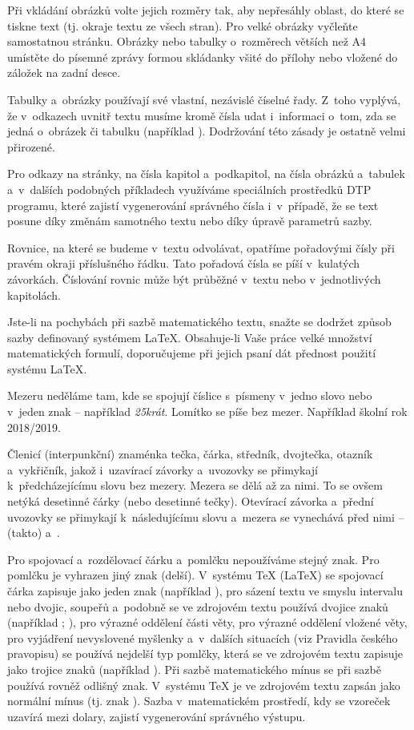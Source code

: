 Při vkládání obrázků volte jejich rozměry tak, aby nepřesáhly oblast, do které se tiskne text (tj. okraje textu ze všech stran). Pro velké obrázky vyčleňte samostatnou stránku. Obrázky nebo tabulky o~rozměrech větších než A4 umístěte do písemné zprávy formou skládanky všité do přílohy nebo vložené do záložek na zadní desce.

Tabulky a~obrázky používají své vlastní, nezávislé číselné řady. Z~toho vyplývá, že v~odkazech uvnitř textu musíme kromě čísla udat i~informaci o~tom, zda se jedná o~obrázek či tabulku (například ). Dodržování této zásady je ostatně velmi přirozené.

Pro odkazy na stránky, na čísla kapitol a~podkapitol, na čísla obrázků a~tabulek a~v~dalších podobných příkladech využíváme speciálních prostředků DTP programu, které zajistí vygenerování správného čísla i~v~případě, že se text posune díky změnám samotného textu nebo díky úpravě parametrů sazby. 


Rovnice, na které se budeme v~textu odvolávat, opatříme pořadovými čísly při pravém okraji příslušného řádku. Tato pořadová čísla se píší v~kulatých závorkách. Číslování rovnic může být průběžné v~textu nebo v~jednotlivých kapitolách. 

Jste-li na pochybách při sazbě matematického textu, snažte se dodržet způsob sazby definovaný systémem \LaTeX{}. Obsahuje-li Vaše práce velké množství matematických formulí, doporučujeme při jejich psaní dát přednost použití systému \LaTeX{}.

Mezeru neděláme tam, kde se spojují číslice s~písmeny v~jedno slovo nebo v~jeden znak -- například {\it 25krát}. Lomítko se píše bez mezer. Například školní rok 2018/2019.

Členicí (interpunkční) znaménka tečka, čárka, středník, dvojtečka, otazník a~vykřičník, jakož i~uzavírací závorky a~uvozovky se přimykají k~předcházejícímu slovu bez mezery. Mezera se dělá až za nimi. To se ovšem netýká desetinné čárky (nebo desetinné tečky). Otevírací závorka a~přední uvozovky se přimykají k~následujícímu slovu a~mezera se vynechává před nimi -- (takto) a~.

Pro spojovací a~rozdělovací čárku a~pomlčku nepoužíváme stejný znak. Pro pomlčku je vyhrazen jiný znak (delší). V~systému TeX (\LaTeX{}) se spojovací čárka zapisuje jako jeden znak  (například ), pro sázení textu ve smyslu intervalu nebo dvojic, soupeřů a~podobně se ve zdrojovém textu používá dvojice znaků  (například ; ), pro výrazné oddělení části věty, pro výrazné oddělení vložené věty, pro vyjádření nevyslovené myšlenky a~v~dalších situacích (viz Pravidla českého pravopisu) se používá nejdelší typ pomlčky, která se ve zdrojovém textu zapisuje jako trojice znaků  (například ). Při sazbě matematického mínus se při sazbě používá rovněž odlišný znak. V~systému TeX je ve zdrojovém textu zapsán jako normální mínus (tj. znak ). Sazba v~matematickém prostředí, kdy se vzoreček uzavírá mezi dolary, zajistí vygenerování správného výstupu.

